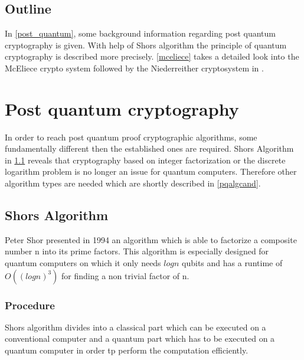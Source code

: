\subsection*{Outline}
In \autoref{post_quantum}, some background information regarding post quantum cryptography is given. With help of Shors algorithm the principle of quantum cryptography is described more precisely. \autoref{mceliece} takes a detailed look into the McEliece crypto system followed by the Niederreither cryptosystem in . 


\section{Post quantum cryptography}
\label{post_quantum}
In order to reach post quantum proof cryptographic algorithms, some fundamentally different then the established ones are required. Shors Algorithm in \ref{shoor} reveals that cryptography based on integer factorization or the discrete logarithm problem is no longer an issue for quantum computers. Therefore other algorithm types are needed which are shortly described in \ref{pqalgcand}.   

\subsection{Shors Algorithm}
\label{shoor}
Peter Shor presented in 1994 an algorithm which is able to factorize a composite number n into its prime factors. This algorithm is especially designed for quantum computers on which it only needs $log n$ qubits and has a runtime of $O((log n)^3)$ for finding a non trivial factor of n. 



\subsubsection{Procedure}
Shors algorithm divides into a classical part which can be executed on a conventional computer and a quantum part which has to be executed on a quantum computer in order tp perform the computation efficiently. 

